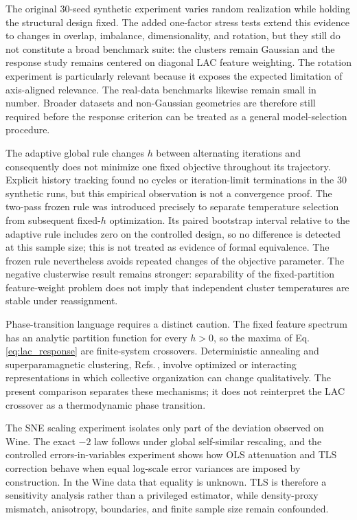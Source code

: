 \documentclass[11pt,a4paper]{article}
\theoremstyle{definition}
\theoremstyle{plain}
\begin{document}
The original 30-seed synthetic experiment varies random realization while holding the structural design fixed. The added one-factor stress tests extend this evidence to changes in overlap, imbalance, dimensionality, and rotation, but they still do not constitute a broad benchmark suite: the clusters remain Gaussian and the response study remains centered on diagonal LAC feature weighting. The rotation experiment is particularly relevant because it exposes the expected limitation of axis-aligned relevance. The real-data benchmarks likewise remain small in number. Broader datasets and non-Gaussian geometries are therefore still required before the response criterion can be treated as a general model-selection procedure.

The adaptive global rule changes $h$ between alternating iterations and consequently does not minimize one fixed objective throughout its trajectory. Explicit history tracking found no cycles or iteration-limit terminations in the 30 synthetic runs, but this empirical observation is not a convergence proof. The two-pass frozen rule was introduced precisely to separate temperature selection from subsequent fixed-$h$ optimization. Its paired bootstrap interval relative to the adaptive rule includes zero on the controlled design, so no difference is detected at this sample size; this is not treated as evidence of formal equivalence. The frozen rule nevertheless avoids repeated changes of the objective parameter. The negative clusterwise result remains stronger: separability of the fixed-partition feature-weight problem does not imply that independent cluster temperatures are stable under reassignment.

Phase-transition language requires a distinct caution. The fixed feature spectrum has an analytic partition function for every $h>0$, so the maxima of Eq.\,\eqref{eq:lac_response} are finite-system crossovers. Deterministic annealing and superparamagnetic clustering, Refs.\,\cite{rose1990phase,blatt1996spc,wiseman1998spc}, involve optimized or interacting representations in which collective organization can change qualitatively. The present comparison separates these mechanisms; it does not reinterpret the LAC crossover as a thermodynamic phase transition.

The SNE scaling experiment isolates only part of the deviation observed on Wine. The exact $-2$ law follows under global self-similar rescaling, and the controlled errors-in-variables experiment shows how OLS attenuation and TLS correction behave when equal log-scale error variances are imposed by construction. In the Wine data that equality is unknown. TLS is therefore a sensitivity analysis rather than a privileged estimator, while density-proxy mismatch, anisotropy, boundaries, and finite sample size remain confounded.
\end{document}
